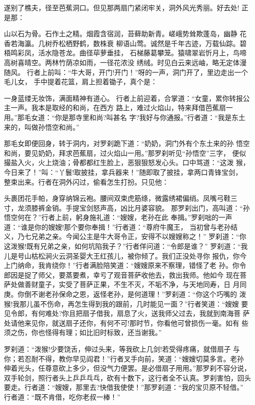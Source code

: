 遂别了樵夫，径至芭蕉洞口。但见那两扇门紧闭牢关，洞外风光秀丽。好去处!
正是那：

山以石为骨。石作土之精。烟霞含宿润，苔藓助新青。嵯峨势耸欺蓬岛，幽静
花香若海瀛。几树乔松栖野鹤，数株衰
柳语山莺。诚然是千年古迹，万载仙踪。碧梧鸣彩凤，活水隐苍龙。曲径荜萝垂挂，
石梯藤葛攀笼。猿啸翠岩忻月上，鸟啼高树喜晴空。两林竹荫凉如雨，一径花浓没
绣绒。时见白云来远岫，略无定体漫随风。
行者上前叫：“牛大哥，开门!开门！”呀的一声，洞门开了，里边走出一个毛儿女，
手中提着花篮，肩上担着锄子，真个是：

一身蓝缕无妆饰，满面精神有道心。
行者上前迎着，合掌道：“女童，累你转报公主一声。我本是取经的和尚，在西方
路上，难过火焰山，特来拜借芭蕉扇一用。”那毛女道：“你是那寺里和尚?叫甚名
字?我好与你通报。”行者道：“我是东土来的，叫做孙悟空和尚。”

那毛女即便回身，转于洞内，对罗刹跪下道：“奶奶，洞门外有个东土来的孙
悟空和尚，要见奶奶，拜求芭蕉扇，过火焰山一用。”那罗刹听见“孙悟空”三字，
便似撮盐入火，火上烧油；骨都都红生脸上，恶狠狠怒发心头。口中骂道：“这泼
猴，今日来了！”叫：“丫鬟!取披挂，拿兵器来！”随即取了披挂，拿两口青锋宝剑，
整束出来。行者在洞外闪过，偷看怎生打扮。只见他：

头裹团花手帕，身穿纳锦云袍。腰间双束虎筋绦，微露绣裙偏绡。凤嘴弓鞋三
寸，龙须膝裤金销。手提宝剑怒声高，凶比月婆容貌。
那罗刹出门，高叫道：“孙悟空何在？”行者上前，躬身施礼道：“嫂嫂，老孙在此
奉揖。”罗刹咄的一声道：“谁是你的嫂嫂!那个要你奉揖！”行者道：“尊府牛魔王，
当初曾与老孙结义，乃七兄弟之亲。今闻公主是牛大哥令正，安得不以嫂嫂称之！”
罗刹道：“你这泼猴!既有兄弟之亲，如何坑陷我子？”行者佯问道：“令郎是谁？”
罗刹道：“我儿是号山枯松涧火云洞圣婴大王红孩儿，被你倾了。我们正没处寻你
报仇，你今上门纳命，我肯绕你！”行者满脸陪笑道：“嫂嫂原来不察理，错怪了老
孙。你令郎因是捉了师父，要蒸要煮，幸亏了观音菩萨收他去，救出我师。他如今
现在菩萨处做善财童子，实受了菩萨正果，不生不灭，不垢不净，与天地同寿，日
月同庚。你倒不谢老孙保命之恩，返怪老孙，是何道理！”罗刹道：“你这个巧嘴的
泼猴!我那儿虽不伤命，再怎生得到我的跟前，几时能见一面？”行者笑道：“嫂嫂
要见令郎，有何难处?你且把扇子借我，扇息了火，送我师父过去，我就到南海菩
萨处请他来见你，就送扇子还你，有何不可!那时节，你看他可曾损伤一毫。如有
些须之伤，你也怪得有理；如比旧时标致，还当谢我。”

罗刹道：“泼猴!少要饶舌，伸过头来，等我砍上几剑!若受得疼痛，就借扇子
与你；若忍耐不得，教你早见阎君！”行者叉手向前，笑道：“嫂嫂切莫多言。老孙
伸着光头，任尊意砍上多少，但没气力便罢。是必借扇子用用。”那罗刹不容分说，
双手轮剑，照行者头上乒乒乓乓，砍有十数下，这行者全不认真。罗刹害怕，回头
要走。行者道：“嫂嫂，那里去?快借我使使！”那罗刹道：“我的宝贝原不轻借。”
行者道：“既不肯借，吃你老叔一棒！”

